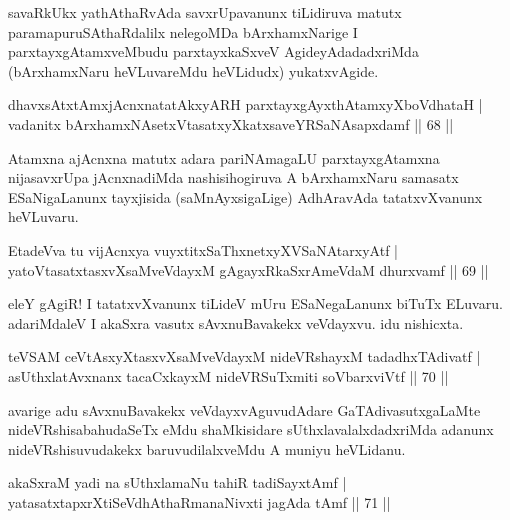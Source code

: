 \begin{artha}
savaRkUkx yathAthaRvAda savxrUpavanunx tiLidiruva matutx paramapuruSAthaR\-dalilx nelegoMDa bArxhamxNarige I parxtayxgAtamxveMbudu parxtayxkaSxveV AgideyAdadadxriMda (bArxhamxNaru heVLuvareMdu heVLidudx) yukatxvAgide.
\end{artha}

\begin{shl}
dhavxsAtxtAmxjAcnxnatatAkxyARH parxtayxgAyxthAtamxyXboVdhataH |\\
vadanitx bArxhamxNAsetxV\s tasatxyXkatxsaveYRSaNAsapxdamf \hfill || 68 ||
\end{shl}

\begin{artha}
Atamxna ajAcnxna matutx adara pariNAmagaLU parxtayxgAtamxna nijasavxrUpa jAcnxnadiMda nashisihogiruva A bArxhamxNaru samasatx ESaNigaLanunx tayxjisida (saMnAyxsigaLige) AdhAravAda tatatxvXvanunx heVLuvaru.
\end{artha}

\begin{shl}
EtadeVva tu vijAcnxya vuyxtitxSaThxnetxyXVSaNAtarxyAtf |\\
yatoV\s tasatxtasxvXsaMveVdayxM gAgayxRkaSxrAmeVdaM dhurxvamf \hfill || 69 ||
\end{shl}

\begin{artha}
eleY gAgiR! I tatatxvXvanunx tiLideV mUru ESaNegaLanunx biTuTx ELuvaru. adariMdaleV I akaSxra vasutx sAvxnuBavakekx veVdayxvu. idu nishicxta.
\end{artha}


\begin{shl}
teVSAM ceVtAsxyXtasxvXsaMveVdayxM nideVRshayxM tadadhxTAdivatf |\\
asUthxlatAvxnanx tacaCxkayxM nideVRSuTxmiti soV\s barxviVtf \hfill || 70 ||
\end{shl}

\begin{artha}
avarige adu sAvxnuBavakekx veVdayxvAguvudAdare GaTAdivasutxgaLaMte nideVRshisa\-bahudaSeTx eMdu shaMkisidare sUthxlavalalxdadxriMda adanunx nideVRshisuvudakekx baruvu\-dilalxveMdu A muniyu heVLidanu.
\end{artha}


\begin{shl}
akaSxraM yadi na sUthxlamaNu tahiR tadiSayxtAmf |\\
yatasatxtapxrXtiSeVdhAthaRmanaNivxti jagAda tAmf \hfill || 71 ||
\end{shl}

